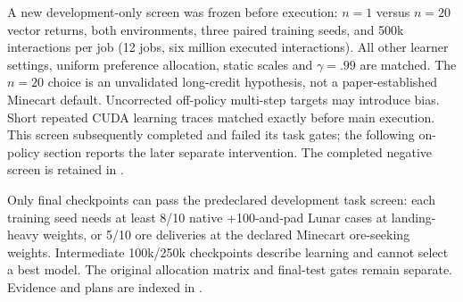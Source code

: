 A new development-only screen was frozen before execution: $n=1$ versus
$n=20$ vector returns, both environments, three paired training seeds, and
500k interactions per job (12 jobs, six million executed interactions).
All other learner settings, uniform preference allocation, static scales and
$\gamma=.99$ are matched. The $n=20$ choice is an unvalidated long-credit
hypothesis, not a paper-established Minecart default. Uncorrected off-policy
multi-step targets may introduce bias. Short repeated CUDA learning traces
matched exactly before main execution. This screen subsequently completed and
failed its task gates; the following on-policy section reports the later
separate intervention. The completed negative screen is retained in
.

Only final checkpoints can pass the predeclared development task screen:
each training seed needs at least 8/10 native +100-and-pad Lunar cases at
landing-heavy weights, or 5/10 ore deliveries at the declared Minecart
ore-seeking weights. Intermediate 100k/250k checkpoints describe learning and
cannot select a best model. The original allocation matrix and final-test
gates remain separate. Evidence and plans are indexed in
.
